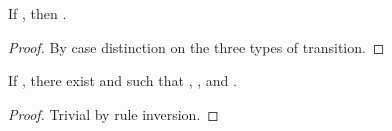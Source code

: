 \begin{isabellebody}
\begin{isamarkuptext}
\begin{lemma}\label{step_reaches_final_imp_S}
If ,
then .
\begin{proof}
By case distinction on the three types of transition.
\end{proof}
\end{lemma}

\begin{lemma}\label{rm_chain_Cons_imp_prod_rightmost}
If , there exist  and  
such that , , and .
\begin{proof}
Trivial by rule inversion.
\end{proof}
\end{lemma}


\end{isamarkuptext}
\end{isabellebody}
